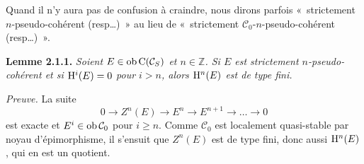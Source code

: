 \documentclass[11pt]{article}
\begin{document}
Quand il n'y aura pas de confusion à craindre, nous dirons parfois «~strictement \(n\)-pseudo-cohérent (resp\dots)~» au lieu de «~strictement \(\mathcal C_0\)-\(n\)-pseudo-cohérent (resp\dots)~».

\textbf{Lemme 2.1.1.} \emph{Soient \(E\in\operatorname{ob}\mathrm C(\mathcal C_S)\) et \(n\in\mathbb Z\). Si \(E\) est strictement \(n\)-pseudo-cohérent et si \(\mathrm H^i(E)=0\) pour \(i>n\), alors \(\mathrm H^n(E)\) est de type fini.}

\emph{Preuve.} La suite
\[
  0\longrightarrow Z^n(E)\longrightarrow E^n\longrightarrow E^{n+1}\longrightarrow\ldots\longrightarrow 0
\]
est exacte et \(E^i\in\operatorname{ob}\mathcal C_0\) pour \(i\geq n\). Comme \(\mathcal C_0\) est localement quasi-stable par noyau d'épimorphisme, il s'ensuit que \(Z^n(E)\) est de type fini, donc aussi \(\mathrm H^n(E)\), qui en est un quotient.
\end{document}
